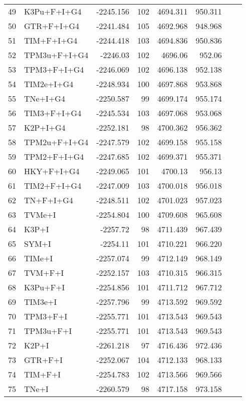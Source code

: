 \begin{longtable}{clrrrrrr}
	49 & K3Pu+F+I+G4 & -2245.156 & 102 & 4694.311 & 950.311 \\ 
	50 & GTR+F+I+G4 & -2241.484 & 105 & 4692.968 & 948.968 \\ 
	51 & TIM+F+I+G4 & -2244.418 & 103 & 4694.836 & 950.836 \\ 
	52 & TPM3u+F+I+G4 & -2246.03 & 102 & 4696.06 & 952.06 \\ 
	53 & TPM3+F+I+G4 & -2246.069 & 102 & 4696.138 & 952.138 \\ 
	54 & TIM2e+I+G4 & -2248.934 & 100 & 4697.868 & 953.868 \\ 
	55 & TNe+I+G4 & -2250.587 & 99 & 4699.174 & 955.174 \\ 
	56 & TIM3+F+I+G4 & -2245.534 & 103 & 4697.068 & 953.068 \\ 
	57 & K2P+I+G4 & -2252.181 & 98 & 4700.362 & 956.362 \\ 
	58 & TPM2u+F+I+G4 & -2247.579 & 102 & 4699.158 & 955.158 \\ 
	59 & TPM2+F+I+G4 & -2247.685 & 102 & 4699.371 & 955.371 \\ 
	60 & HKY+F+I+G4 & -2249.065 & 101 & 4700.13 & 956.13 \\ 
	61 & TIM2+F+I+G4 & -2247.009 & 103 & 4700.018 & 956.018 \\ 
	62 & TN+F+I+G4 & -2248.511 & 102 & 4701.023 & 957.023 \\ 
	63 & TVMe+I & -2254.804 & 100 & 4709.608 & 965.608 \\ 
	64 & K3P+I & -2257.72 & 98 & 4711.439 & 967.439 \\ 
	65 & SYM+I & -2254.11 & 101 & 4710.221 & 966.220 \\ 
	66 & TIMe+I & -2257.074 & 99 & 4712.149 & 968.149 \\ 
	67 & TVM+F+I & -2252.157 & 103 & 4710.315 & 966.315 \\ 
	68 & K3Pu+F+I & -2254.856 & 101 & 4711.712 & 967.712 \\ 
	69 & TIM3e+I & -2257.796 & 99 & 4713.592 & 969.592 \\ 
	70 & TPM3+F+I & -2255.771 & 101 & 4713.543 & 969.543 \\ 
	71 & TPM3u+F+I & -2255.771 & 101 & 4713.543 & 969.543 \\ 
	72 & K2P+I & -2261.218 & 97 & 4716.436 & 972.436 \\ 
	73 & GTR+F+I & -2252.067 & 104 & 4712.133 & 968.133 \\ 
	74 & TIM+F+I & -2254.783 & 102 & 4713.566 & 969.566 \\ 
	75 & TNe+I & -2260.579 & 98 & 4717.158 & 973.158 \\ 

\end{longtable}
